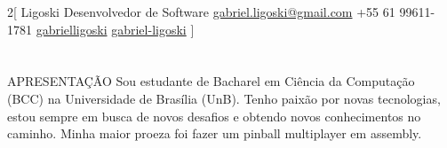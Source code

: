 \documentclass{my_cvPT}
\begin{document}
\begin{multicols}{2}[
        {Ligoski}%
        {Desenvolvedor de Software}%
        {\href{mailto:gabriel.ligoski@gmail.com}{gabriel.ligoski@gmail.com}}%
        {+55 61 99611-1781}%
        {\href{https://github.com/gabrielligoski}{gabrielligoski} }%
        {\href{https://www.linkedin.com/in/gabriel-ligoski/}{gabriel-ligoski} }%
]
\end{multicols}
\vspace{15mm}
\section{\faFileText}{APRESENTAÇÃO}
Sou estudante de Bacharel em Ciência da Computação (BCC) 
na Universidade de Brasília (UnB). Tenho paixão por novas tecnologias, estou 
sempre em busca de novos desafios e obtendo novos conhecimentos no caminho.
Minha maior proeza foi fazer um pinball multiplayer em assembly.

\vspace{5mm}
\end{document}
